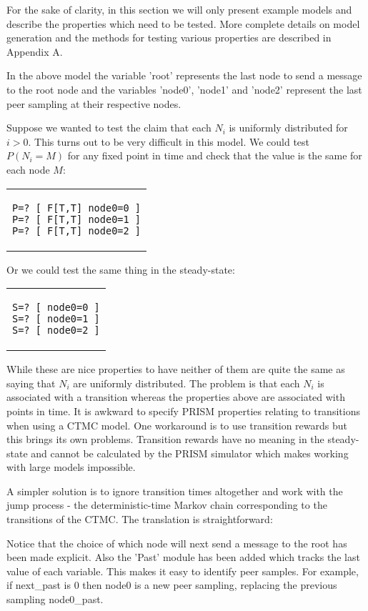 \documentclass[a4paper,10pt]{article}
\newcommand{\code}[1]{
  \footnotesize
  
}
\newcommand{\prismmodel}[1]{
  \begin{quotation}
  \code{../models/#1.sm}
  \end{quotation}
}
\newenvironment{prismprop}[0]{
  \begin{center}
  \begin{tabular}{c}
  \footnotesize
}{
  \end{tabular}
  \end{center}
}
\begin{document}
\prismmodel{ctmc_single}

For the sake of clarity, in this section we will only present example models and describe the properties which need to be tested. More complete details on model generation and the methods for testing various properties are described in Appendix A.

In the above model the variable 'root' represents the last node to send a message to the root node and the variables 'node0', 'node1' and 'node2' represent the last peer sampling at their respective nodes.

Suppose we wanted to test the claim that each $N_i$ is uniformly distributed for $i>0$. This turns out to be very difficult in this model. We could test $P(N_i = M)$ for any fixed point in time and check that the value is the same for each node $M$:

\begin{prismprop}
\begin{lstlisting}
P=? [ F[T,T] node0=0 ]
P=? [ F[T,T] node0=1 ]
P=? [ F[T,T] node0=2 ]
\end{lstlisting}
\end{prismprop}

Or we could test the same thing in the steady-state:

\begin{prismprop}
\begin{lstlisting}
S=? [ node0=0 ]
S=? [ node0=1 ]
S=? [ node0=2 ]
\end{lstlisting}
\end{prismprop}

While these are nice properties to have neither of them are quite the same as saying that $N_i$ are uniformly distributed. The problem is that each $N_i$ is associated with a transition whereas the properties above are associated with points in time. It is awkward to specify PRISM properties relating to transitions when using a CTMC model. One workaround is to use transition rewards but this brings its own problems. Transition rewards have no meaning in the steady-state and cannot be calculated by the PRISM simulator which makes working with large models impossible.

A simpler solution is to ignore transition times altogether and work with the jump process - the deterministic-time Markov chain corresponding to the transitions of the CTMC. The translation is straightforward:

\prismmodel{dtmc_single}

Notice that the choice of which node will next send a message to the root has been made explicit. Also the 'Past' module has been added which tracks the last value of each variable. This makes it easy to identify peer samples. For example, if next\_past is 0 then node0 is a new peer sampling, replacing the previous sampling node0\_past.
\end{document}
